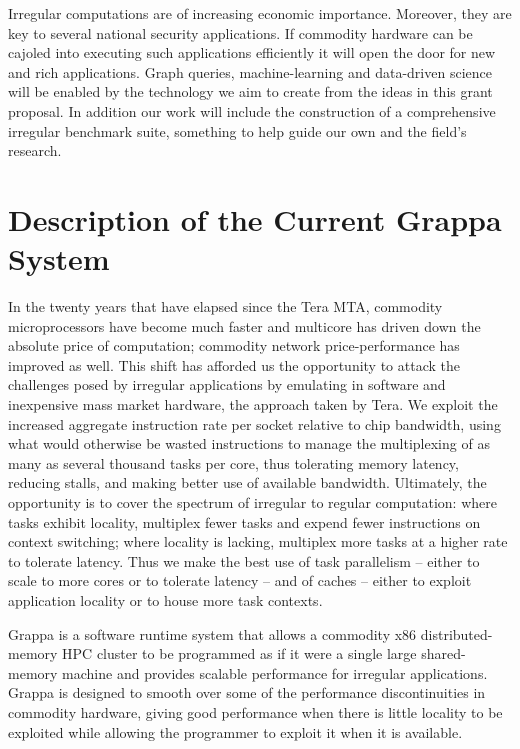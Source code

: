 Irregular computations are of increasing economic importance.  Moreover, they are key to several national security applications.  If commodity hardware can be cajoled into executing such applications efficiently it will open the door for new and rich applications.  Graph queries, machine-learning and data-driven science will be enabled by the technology we aim to create from the ideas in this grant proposal.  In addition our work will include the construction of a comprehensive irregular benchmark suite, something to help guide our own and the field's research.


\section{Description of the Current Grappa System}

In the twenty years that have elapsed since the Tera MTA, commodity microprocessors have become much faster and multicore has driven down the absolute price of computation; commodity network price-performance has improved as well. This shift has afforded us the opportunity to attack the challenges posed by irregular applications by emulating in software and inexpensive mass market hardware, the approach taken by Tera. We exploit the increased aggregate instruction rate per socket relative to chip bandwidth, using what would otherwise be wasted instructions to manage the multiplexing of as many as several thousand tasks per core, thus tolerating memory latency, reducing stalls, and making better use of available bandwidth. Ultimately, the opportunity is to cover the spectrum of irregular to regular computation: where tasks exhibit locality, multiplex fewer tasks and expend fewer instructions on context switching; where locality is lacking, multiplex more tasks at a higher rate to tolerate latency. Thus we make the best use of task parallelism -- either to scale to more cores or to tolerate latency -- and of caches -- either to exploit application locality or to house more task contexts.

Grappa is a software runtime system that allows a commodity x86 distributed-memory HPC cluster to be programmed as if it were a single large shared-memory machine and provides scalable performance for irregular applications. Grappa is designed to smooth over some of the performance discontinuities in commodity hardware, giving good performance when there is little locality to be exploited while allowing the programmer to exploit it when it is available.

